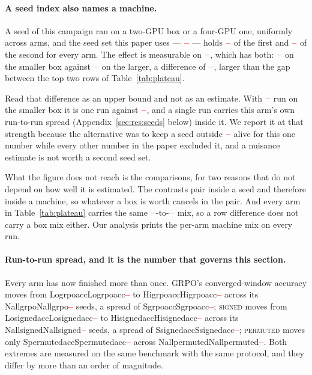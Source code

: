 \documentclass[11pt]{article}
\providecommand{\PENDING}{\textcolor{red}{\textbf{--}}}
\newcommand{\num}[1]{\ifcsname #1\endcsname\csname #1\endcsname\else\PENDING\fi}
\begin{document}
\paragraph{A seed index also names a machine.} A seed of this campaign ran on a
two-GPU box or a four-GPU one, uniformly across arms, and the seed set this paper
uses --- $\num{Seedset}$ --- holds $\num{Boxnlo}$ of the first and $\num{Boxnhi}$ of
the second for every arm. The effect is measurable on $\num{Boxarm}$, which has both:
$\num{Boxlo}$ on the smaller box against $\num{Boxhi}$ on the larger, a difference of
$\num{Boxdelta}$, larger than the gap between the top two rows of
Table~\ref{tab:plateau}.

Read that difference as an upper bound and not as an estimate. With
$\num{Boxnlo}$ run on the smaller box it is one run against $\num{Boxnhi}$, and a
single run carries this arm's own run-to-run spread (Appendix~\ref{sec:res:seeds}
below) inside it. We report it at that strength because the alternative was to keep a
seed outside $\num{Seedset}$ alive for this one number while every other number in
the paper excluded it, and a nuisance estimate is not worth a second seed set.

What the figure does not reach is the comparisons, for two reasons that do not depend
on how well it is estimated. The contrasts pair inside a seed and therefore inside a
machine, so whatever a box is worth cancels in the pair. And every arm in
Table~\ref{tab:plateau} carries the same $\num{Boxnlo}$-to-$\num{Boxnhi}$ mix, so a
row difference does not carry a box mix either. Our analysis prints the per-arm machine
mix on every run.

\paragraph{Run-to-run spread, and it is the number that governs this section.}
Every arm has now finished more than once. GRPO's converged-window accuracy moves
from \num{Logrpoacc} to \num{Higrpoacc} across its \num{Nallgrpo} seeds, a spread
of \num{Sgrpoacc}; \textsc{signed} moves from \num{Losignedacc} to \num{Hisignedacc} across
its \num{Nallsigned} seeds, a spread of \num{Ssignedacc}; \textsc{permuted}
moves only \num{Spermutedacc} across \num{Nallpermuted}. Both extremes are
measured on the same benchmark with the same protocol, and they differ by more than
an order of magnitude.
\end{document}
